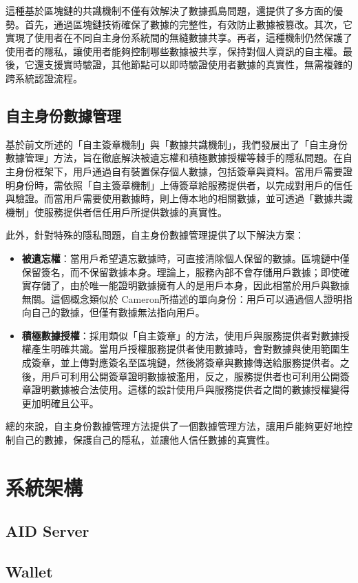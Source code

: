 這種基於區塊鏈的共識機制不僅有效解決了數據孤島問題，還提供了多方面的優勢。首先，通過區塊鏈技術確保了數據的完整性，有效防止數據被篡改。其次，它實現了使用者在不同自主身份系統間的無縫數據共享。再者，這種機制仍然保護了使用者的隱私，讓使用者能夠控制哪些數據被共享，保持對個人資訊的自主權。最後，它還支援實時驗證，其他節點可以即時驗證使用者數據的真實性，無需複雜的跨系統認證流程。
\subsection{自主身份數據管理}
基於前文所述的「自主簽章機制」與「數據共識機制」，我們發展出了「自主身份數據管理」方法，旨在徹底解決被遺忘權和積極數據授權等棘手的隱私問題。在自主身份框架下，用戶通過自有裝置保存個人數據，包括簽章與資料。當用戶需要證明身份時，需依照「自主簽章機制」上傳簽章給服務提供者，以完成對用戶的信任與驗證。而當用戶需要使用數據時，則上傳本地的相關數據，並可透過「數據共識機制」使服務提供者信任用戶所提供數據的真實性。

此外，針對特殊的隱私問題，自主身份數據管理提供了以下解決方案：
\begin{itemize}
  \item \textbf{被遺忘權}：當用戶希望遺忘數據時，可直接清除個人保留的數據。區塊鏈中僅保留簽名，而不保留數據本身。理論上，服務內部不會存儲用戶數據；即使確實存儲了，由於唯一能證明數據擁有人的是用戶本身，因此相當於用戶與數據無關。這個概念類似於 Cameron\cite{cameron2005laws}所描述的單向身份：用戶可以通過個人證明指向自己的數據，但僅有數據無法指向用戶。
  \item \textbf{積極數據授權}：採用類似「自主簽章」的方法，使用戶與服務提供者對數據授權產生明確共識。當用戶授權服務提供者使用數據時，會對數據與使用範圍生成簽章，並上傳對應簽名至區塊鏈，然後將簽章與數據傳送給服務提供者。之後，用戶可利用公開簽章證明數據被濫用，反之，服務提供者也可利用公開簽章證明數據被合法使用。這樣的設計使用戶與服務提供者之間的數據授權變得更加明確且公平。
\end{itemize}

總的來說，自主身份數據管理方法提供了一個數據管理方法，讓用戶能夠更好地控制自己的數據，保護自己的隱私，並讓他人信任數據的真實性。
\section{系統架構}
\subsection{AID Server}
\subsection{Wallet}
